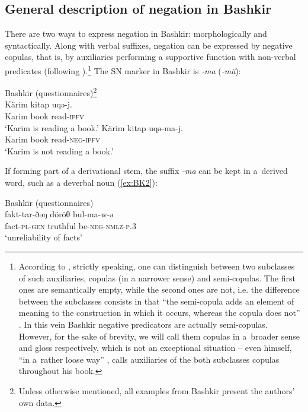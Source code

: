 \documentclass[output=paper,draft,draftmode,colorlinks,citecolor=brown]{langscibook}
\begin{document}
\subsection{General description of negation in Bashkir}\label{sec:BK2.1}
\largerpage[-1]
There are two ways to express negation in Bashkir: morphologically and syntactically. Along with verbal suffixes, negation can be expressed by negative copulas, that is, by auxiliaries performing a supportive function with non-verbal predicates (following \citealp{hengeveld1992a}).\footnote{According to \citeauthor{hengeveld1992a}, strictly speaking, one can distinguish between two subclasses of such auxiliaries, copulas (in a narrower sense) and semi-copulas. The first ones are semantically empty, while the second ones are not, i.e. the difference between the subclasses consists in that “the semi-copula adds an element of meaning to the construction in which it occurs, whereas the copula does not” \citeyearpar[35]{hengeveld1992a}. In this vein Bashkir negative predicators are actually semi-copulas. However, for the sake of brevity, we will call them copulas in a broader sense and gloss respectively, which is not an exceptional situation – even \citeauthor{hengeveld1992a} himself, “in a rather loose way” \citeyearpar[32]{hengeveld1992a}, calls auxiliaries of the both subclasses copulas throughout his book.} The SN marker in Bashkir is \textit{‑ma} (\textit{‑mä}):

\ea Bashkir (questionnaires)\footnote{Unless otherwise mentioned, all examples from Bashkir present the authors’ own data.} \label{ex:BK1}\\
  \ea
	\gll Kärim	kitap	uqə-j.\\
	Karim		book	read-\textsc{ipfv}\\
	\glt `Karim is reading a book.'
  \ex
	\gll Kärim	kitap	uqə-ma-j.\\
	Karim		book	read-\textsc{neg-ipfv}\\
	\glt `Karim is not reading a book.'
\z \z


If forming part of a derivational stem, the suffix \textit{-ma} can be kept in a derived word, such as a deverbal noun (\ref{ex:BK2}):

\ea Bashkir (questionnaires) \label{ex:BK2}\\
	\gll fakt-tar-ðəŋ	döröθ	bul-ma-w-ə\\
	fact-\textsc{pl-gen}	truthful	be-\textsc{neg-nmlz-p.3}\\
	\glt `unreliability of facts'
\z
\end{document}
